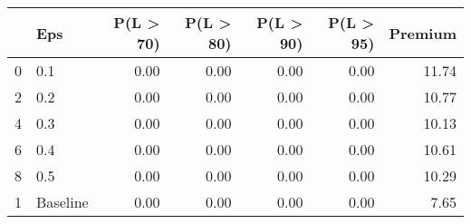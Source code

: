 \begin{tabular}{llrrrrr}
\toprule
{} &       Eps &  P(L > 70) &  P(L > 80) &  P(L > 90) &  P(L > 95) &  Premium \\
\midrule
0 &       0.1 &       0.00 &       0.00 &       0.00 &       0.00 &    11.74 \\
2 &       0.2 &       0.00 &       0.00 &       0.00 &       0.00 &    10.77 \\
4 &       0.3 &       0.00 &       0.00 &       0.00 &       0.00 &    10.13 \\
6 &       0.4 &       0.00 &       0.00 &       0.00 &       0.00 &    10.61 \\
8 &       0.5 &       0.00 &       0.00 &       0.00 &       0.00 &    10.29 \\
1 &  Baseline &       0.00 &       0.00 &       0.00 &       0.00 &     7.65 \\
\bottomrule
\end{tabular}
